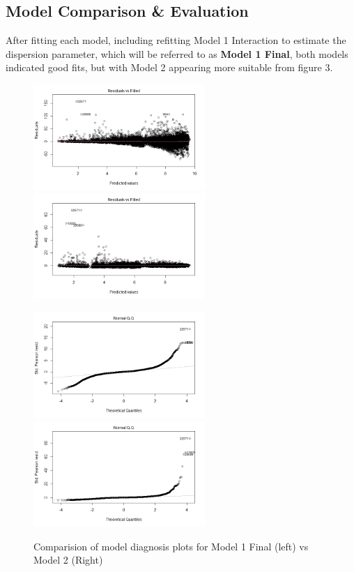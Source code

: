 \documentclass[11pt]{article}
\begin{document}
\subsection{Model Comparison & Evaluation}
After fitting each model, including refitting Model 1 Interaction to estimate the dispersion parameter, which will be referred to as \textbf{Model 1 Final}, both models indicated good fits, but with Model 2 appearing more suitable from figure 3. 
\begin{figure}[h]
\centering

\caption{Comparision of model diagnosis plots for Model 1 Final (left) vs Model 2 (Right) }
 \includegraphics[width=65mm]{plots/Pois_plot_1.png}
\includegraphics[width=65mm]{plots/Neg_Bin_plot_1.png}
\hspace{0mm}

\includegraphics[width=65mm]{plots/Pois_plot_2.png}
\includegraphics[width=65mm]{plots/Neg_Bin_plot_2.png}
\end{figure}
\end{document}
